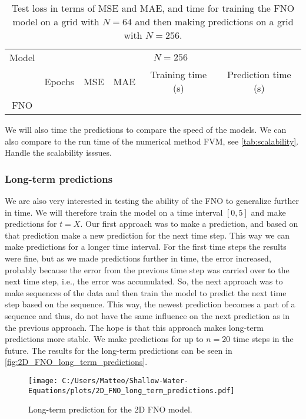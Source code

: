 \begin{table}[H]
    \centering
    \begin{tabular}{c|ccccc}
        Model & \multicolumn{5}{c}{$N = 256$} \\
        \cline{2-6}
        & Epochs & MSE & MAE & Training time (s) & Prediction time (s) \\
        \hline
        FNO  &
         &
         &
         &
         &
        
    \end{tabular}
    \caption{Test loss in terms of MSE and MAE, and time for training the FNO model on a grid with $N = 64$ and then making predictions on a grid with $N = 256$.}\label{tab:results_2D_FNO_train_64_test_256}
\end{table}



We will also time the predictions to compare the speed of the models.
We can also compare to the run time of the numerical method FVM, see \autoref{tab:scalability}.
Handle the scalability isssues.


\subsubsection*{Long-term predictions}
We are also very interested in testing the ability of the FNO to generalize further in time.
We will therefore train the model on a time interval $[0, 5]$ and make predictions for $t = X$.
Our first approach was to make a prediction, and based on that prediction make a new prediction for the next time step.
This way we can make predictions for a longer time interval.
For the first time steps the results were fine, but as we made predictions further in time, the error increased, probably because the error from the previous time step was carried over to the next time step, i.e., the error was accumulated.
So, the next approach was to make sequences of the data and then train the model to predict the next time step based on the sequence. 
This way, the newest prediction becomes a part of a sequence and thus, do not have the same influence on the next prediction as in the previous approach.
The hope is that this approach makes long-term predictions more stable.
We make predictions for up to $n = 20$ time steps in the future.
The results for the long-term predictions can be seen in \autoref{fig:2D_FNO_long_term_predictions}.
\begin{figure}[H]
    \centering
    \texttt{[image: C:/Users/Matteo/Shallow-Water-Equations/plots/2D\_FNO\_long\_term\_predictions.pdf]}
    \caption{Long-term prediction for the 2D FNO model.}\label{fig:2D_FNO_long_term_predictions}
\end{figure}

